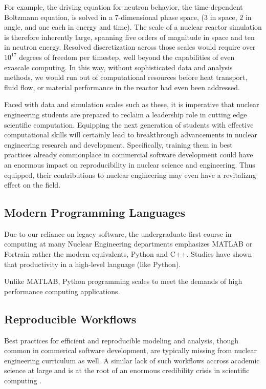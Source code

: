\documentclass{anstrans}
\begin{document}
For example, the driving equation for neutron behavior, the time-dependent
Boltzmann equation, is solved in a 7-dimensional phase space, ($3$ in space, $2$
in angle, and one each in energy and time). The scale of a nuclear reactor
simulation is therefore inherently large, spanning five orders of magnitude in space and
ten in neutron energy. Resolved discretization across those scales would require
over $10^{17}$ degrees of freedom per timestep, well beyond the
capabilities of even exascale computing. In this way, without sophisticated
data and analysis methods, we would run out of computational resources before
heat transport, fluid flow, or material performance in the reactor had even
been addressed.

Faced with data and simulation scales such as these, it is imperative
that nuclear engineering students are prepared to reclaim a leadership role in
cutting edge scientific computation. Equipping the next generation of
students with effective computational skills will certainly lead to breakthrough
advancements in nuclear engineering research and development.
Specifically, training them in best practices already commonplace in commercial
software development could have an enormous impact on reproducibility in
nuclear science and engineering. Thus equipped, their contributions to nuclear
engineering may even have a revitalizng effect on the field.

\subsection{Modern Programming Languages}

Due to our reliance on legacy software, the undergraduate first course in
computing at many Nuclear Engineering departments emphasizes MATLAB or Fortrain
rather the modern equivalents, Python and C++. Studies have shown that
productivity in a high-level language (like Python).

Unlike MATLAB, Python programming scales to meet the demands of high performance computing applications.

\subsection{Reproducible Workflows}

Best practices for efficient and reproducible modeling and analysis, though
common in commerical software development, are typically missing from nuclear
engineering curriculum as well. A similar lack of such workflows accross
academic science at large and is  at the root of an enormous credibility
crisis in scientific computing \cite{donoho, stodden}.
\end{document}
